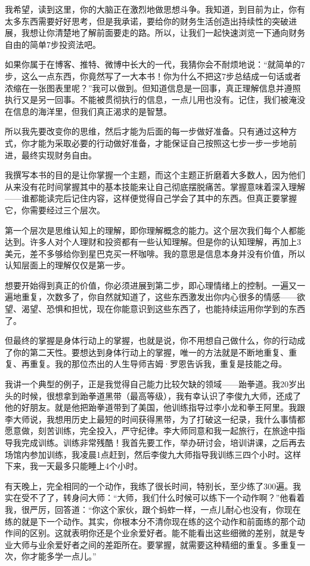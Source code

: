 我希望，读到这里，你的大脑正在激烈地做思想斗争。我知道，到目前为止，你有太多东西需要好好思考，但是我承诺，要给你的财务生活创造出持续性的突破进展，我想让你清楚地了解前面要走的路。所以，让我们一起快速浏览一下通向财务自由的简单7步投资法吧。

如果你属于在博客、推特、微博中长大的一代，我猜你会不耐烦地说：“就简单的7步，这么一点东西，你竟然写了一大本书！你为什么不把这7步总结成一句话或者浓缩在一张图表里呢？”我可以做到。但知道信息是一回事，真正理解信息并遵照执行又是另一回事。不能被贯彻执行的信息，一点儿用也没有。记住，我们被淹没在信息的海洋里，但我们真正渴求的是智慧。

所以我先要改变你的思维，然后才能为后面的每一步做好准备。只有通过这种方式，你才能为采取必要的行动做好准备，才能保证自己按照这七步一步一步地前进，最终实现财务自由。

我撰写本书的目的是让你掌握一个主题，而这个主题正折磨着大多数人，因为他们从来没有花时间掌握其中的基本技能来让自己彻底摆脱痛苦。掌握意味着深入理解——谁都能读完后记住内容，这样便觉得自己学会了其中的东西。但真正要掌握它，你需要经过三个层次。

第一个层次是思维认知上的理解，即你理解概念的能力。这个层次我们每个人都能达到。许多人对个人理财和投资都有一些认知理解。但是你的认知理解，再加上3美元，差不多够给你到星巴克买一杯咖啡。我的意思是信息本身并没有价值，所以认知层面上的理解仅仅是第一步。

想要开始得到真正的价值，你必须进展到第二步，即心理情绪上的控制。一遍又一遍地重复，次数多了，你自然就知道了，这些东西激发出你内心很多的情感——欲望、渴望、恐惧和担忧，现在你能意识到这些东西了，也能持续运用你学到的东西了。

但最终的掌握是身体行动上的掌握，也就是说，你不用想自己做什么，你的行动成了你的第二天性。要想达到身体行动上的掌握，唯一的方法就是不断地重复、重复、再重复。我的那位杰出的人生导师吉姆·罗恩告诉我，重复是技能之母。

我讲一个典型的例子，正是我觉得自己能力比较欠缺的领域——跆拳道。我20岁出头的时候，很想拿到跆拳道黑带（最高等级），我有幸认识了李俊九大师，还成了他的好朋友。就是他把跆拳道带到了美国，他训练指导过李小龙和拳王阿里。我跟李大师说，我想用历史上最短的时间获得黑带，为了打破这一纪录，我什么事情都愿意做，刻苦训练，完全投入，严守纪律。李大师同意和我一起旅行，在旅途中指导我完成训练。训练非常残酷！我首先要工作，举办研讨会，培训讲课，之后再去场馆内参加训练，我凌晨1点赶到，然后李俊九大师指导我训练三四个小时。这样下来，我一天最多只能睡上4个小时。

有天晚上，完全相同的一个动作，我练了很长时间，特别长，至少练了300遍。我实在受不了了，转身问大师：“大师，我们什么时候可以练下一个动作啊？”他看着我，很严厉，回答道：“你这个家伙，跟个蚂蚱一样，一点儿耐心也没有，你现在练的就是下一个动作。其实，你根本分不清你现在练的这个动作和前面练的那个动作间的区别。这就表明你还是个业余爱好者。能不能看出这些细微的差别，就是专业大师与业余爱好者之间的差距所在。要掌握，就需要这种精细的重复。多重复一次，你才能多学一点儿。”

